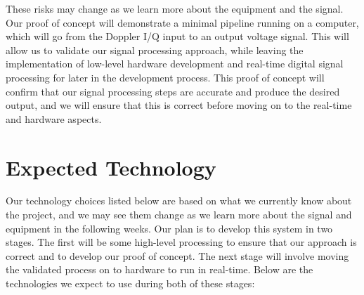 \documentclass{article}
\begin{document}
These risks may change as we learn more about the equipment and the signal. Our
proof of concept will demonstrate a minimal pipeline running on a computer,
which will go from the Doppler I/Q input to an output voltage signal. This will
allow us to validate our signal processing approach, while leaving the
implementation of low-level hardware development and real-time digital signal
processing for later in the development process. This proof of concept will
confirm that our signal processing steps are accurate and produce the desired
output, and we will ensure that this is correct before moving on to the
real-time and hardware aspects.

\section{Expected Technology}

Our technology choices listed below are based on what we currently know about
the project, and we may see them change as we learn more about the signal and
equipment in the following weeks. Our plan is to develop this system in two
stages. The first will be some high-level processing to ensure that our
approach is correct and to develop our proof of concept. The next stage will
involve moving the validated process on to hardware to run in real-time. Below
are the technologies we expect to use during both of these stages:
\end{document}
